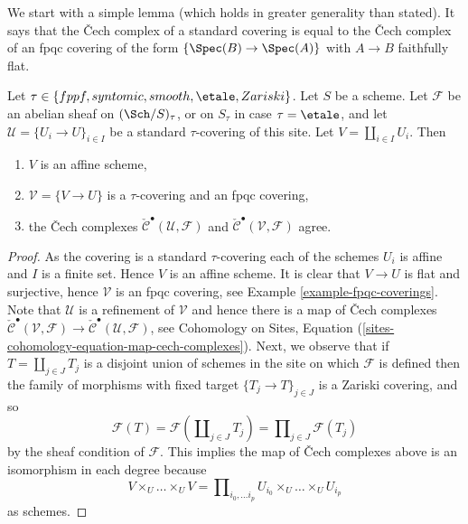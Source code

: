 \noindent
We start with a simple lemma (which holds in greater generality than
stated). It says that the {\v C}ech complex of a standard covering is
equal to the {\v C}ech complex of an fpqc covering of the form
$\{\Spec(B) \to \Spec(A)\}$ with $A \to B$ faithfully flat.

\begin{lemma}
\label{lemma-cech-complex}
Let $\tau \in \{fppf, syntomic, smooth, \etale, Zariski\}$.
Let $S$ be a scheme.
Let $\mathcal{F}$ be an abelian sheaf on $(\Sch/S)_\tau$, or on
$S_\tau$ in case $\tau = \etale$, and let
$\mathcal{U} = \{U_i \to U\}_{i \in I}$
be a standard $\tau$-covering of this site.
Let $V = \coprod_{i \in I} U_i$. Then
\begin{enumerate}
\item $V$ is an affine scheme,
\item $\mathcal{V} = \{V \to U\}$ is a $\tau$-covering and an fpqc covering,
\item the {\v C}ech complexes
$\check{\mathcal{C}}^\bullet (\mathcal{U}, \mathcal{F})$ and
$\check{\mathcal{C}}^\bullet (\mathcal{V}, \mathcal{F})$ agree.
\end{enumerate}
\end{lemma}

\begin{proof}
As the covering is a standard $\tau$-covering each of the schemes
$U_i$ is affine and $I$ is a finite set. Hence $V$ is an affine scheme.
It is clear that $V \to U$ is flat and surjective, hence
$\mathcal{V}$ is an fpqc covering, see
Example \ref{example-fpqc-coverings}.
Note that $\mathcal{U}$ is a refinement of $\mathcal{V}$
and hence there is a map of {\v C}ech complexes
$\check{\mathcal{C}}^\bullet (\mathcal{V}, \mathcal{F}) \to
\check{\mathcal{C}}^\bullet (\mathcal{U}, \mathcal{F})$, see
Cohomology on Sites,
Equation (\ref{sites-cohomology-equation-map-cech-complexes}).
Next, we observe that if $T = \coprod_{j \in J} T_j$ is a
disjoint union of schemes in the site on which $\mathcal{F}$ is defined
then the family of morphisms with fixed target
$\{T_j \to T\}_{j \in J}$ is a Zariski covering, and so
\begin{equation}
\label{equation-sheaf-coprod}
\mathcal{F}(T) =
\mathcal{F}(\coprod\nolimits_{j \in J} T_j) =
\prod\nolimits_{j \in J} \mathcal{F}(T_j)
\end{equation}
by the sheaf condition of $\mathcal{F}$.
This implies the map of {\v C}ech complexes above is an isomorphism
in each degree because
$$
V \times_U \ldots \times_U V
=
\prod\nolimits_{i_0, \ldots i_p} U_{i_0} \times_U \ldots \times_U U_{i_p}
$$
as schemes.
\end{proof}

